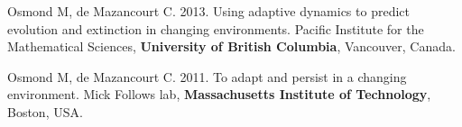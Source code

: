 \documentclass[12pt]{article}
\begin{document}
{Osmond M, de Mazancourt C. 2013. Using adaptive dynamics to predict evolution and extinction in changing environments. Pacific Institute for the Mathematical Sciences, \textbf{University of British Columbia}, Vancouver, Canada.


Osmond M, de Mazancourt C. 2011. To adapt and persist in a changing environment. Mick Follows lab, \textbf{Massachusetts Institute of Technology}, Boston, USA.

%
%
%
%
%
%
%
%
%
%
}
\end{document}
